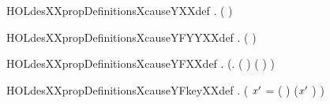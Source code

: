 \newcommand{\HOLdesXXpropDefinitionswtransOneXXdef}{\UseVerbatim{HOLdesXXpropDefinitionswtransOneXXdef}}
\begin{SaveVerbatim}{HOLdesXXpropDefinitionsXcauseYXXdef}
\HOLTokenTurnstile{} \HOLSymConst{\HOLTokenForall{}}  .
         \HOLSymConst{=}   \HOLTokenLeftbrace{} \HOLTokenBar{}   \HOLSymConst{\HOLTokenEor{}}  ( \HOLSymConst{\HOLTokenEor{}} ) \HOLSymConst{=} \HOLTokenRightbrace{}
\end{SaveVerbatim}
\newcommand{\HOLdesXXpropDefinitionsXcauseYXXdef}{\UseVerbatim{HOLdesXXpropDefinitionsXcauseYXXdef}}
\begin{SaveVerbatim}{HOLdesXXpropDefinitionsXcauseYFYYXXdef}
\HOLTokenTurnstile{} \HOLSymConst{\HOLTokenForall{}} .
        \HOLSymConst{=}   \HOLTokenLeftbrace{} \HOLTokenBar{}   \HOLSymConst{\HOLTokenEor{}}  ( \HOLSymConst{\HOLTokenEor{}}  ) \HOLSymConst{=} \HOLTokenRightbrace{}
\end{SaveVerbatim}
\newcommand{\HOLdesXXpropDefinitionsXcauseYFYYXXdef}{\UseVerbatim{HOLdesXXpropDefinitionsXcauseYFYYXXdef}}
\begin{SaveVerbatim}{HOLdesXXpropDefinitionsXcauseYFXXdef}
\HOLTokenTurnstile{} \HOLSymConst{\HOLTokenForall{}} .
        \HOLSymConst{=}
      
       \HOLTokenLeftbrace{} \HOLTokenBar{} (\HOLSymConst{\HOLTokenExists{}}.  (  \HOLSymConst{\HOLTokenEor{}} ) \HOLSymConst{\HOLTokenEor{}}  (  \HOLSymConst{\HOLTokenEor{}}   \HOLSymConst{\HOLTokenEor{}} ) \HOLSymConst{=} )\HOLTokenRightbrace{}
\end{SaveVerbatim}
\newcommand{\HOLdesXXpropDefinitionsXcauseYFXXdef}{\UseVerbatim{HOLdesXXpropDefinitionsXcauseYFXXdef}}
\begin{SaveVerbatim}{HOLdesXXpropDefinitionsXcauseYFkeyXXdef}
\HOLTokenTurnstile{} \HOLSymConst{\HOLTokenForall{}}  .
         \HOLSymConst{=}
     (
        \ensuremath{\HOLBoundVar{x}\sp{\prime{}}} =  \HOLSymConst{\HOLTokenEor{}}  
          \HOLTokenLeftbrace{} \HOLTokenBar{}  ( \HOLSymConst{\HOLTokenEor{}} ) \HOLSymConst{\HOLTokenEor{}}  (\ensuremath{\HOLBoundVar{x}\sp{\prime{}}} \HOLSymConst{\HOLTokenEor{}} ) \HOLSymConst{=} \HOLTokenRightbrace{})
\end{SaveVerbatim}
